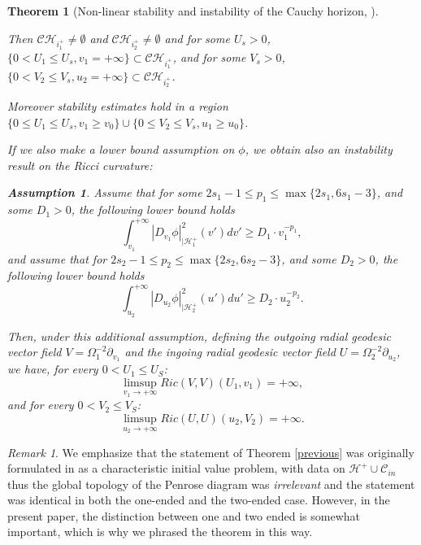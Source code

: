 \documentclass[10pt,a4paper]{article}
\theoremstyle{plain}
\newtheorem{thm}{Theorem}[section]
\theoremstyle{remark}
\newtheorem{rmk}{Remark}[section]
\theoremstyle{definition}
\newtheorem{hyp}{Assumption}
\theoremstyle{plain}
\theoremstyle{remark}
\theoremstyle{definition}
\newcommand{\CHone}{\mathcal{CH}_{i^+_1}}
\newcommand{\CHtwo}{\mathcal{CH}_{i^+_2}}
\numberwithin{equation}{section}
\begin{document}
\begin{thm}[Non-linear stability and instability of the Cauchy horizon, \cite{Moi}]
\begin{enumerate}
		
		
		
		
		
		
		
		
		
		
		
		
		
		Then $\CHone \neq \emptyset $ and $\CHtwo \neq \emptyset $ and for some $U_s>0$, $ \{ 0 < U_1 \leq U_s, v_1=+\infty \} \subset \CHone$, and for some $V_s>0$, $ \{ 0 < V_2 \leq V_s, u_2=+\infty \} \subset \CHtwo$. 
		
		Moreover stability estimates hold in a region $\{ 0 \leq U_1 \leq U_s, v_1\geq v_0\} \cup \{ 0 \leq V_2 \leq V_s, u_1\geq u_0\}$.
		
		
		
		If we also make a lower bound assumption on $\phi$, we obtain also an instability result on the Ricci curvature: \begin{hyp}
			Assume that for some $2s_1-1 \leq p_1 \leq  \max \{2s_1, 6s_1-3\}$, and some $D_1>0$, the following lower bound holds $$ \int_{v_1}^{+\infty}|D_{v_1} \phi|_{|\mathcal{H}^+_1}^2(v')dv' \geq D_1 \cdot v_1^{-p_1},$$ 	and assume that for $2s_2-1 \leq p_2 \leq  \max \{2s_2, 6s_2-3\}$, and some $D_2>0$, the following lower bound holds $$ \int_{u_2}^{+\infty}|D_{u_2} \phi|_{|\mathcal{H}^+_2}^2(u')du' \geq D_2 \cdot u_2^{-p_2}.$$
		\end{hyp}
		
		Then, under this additional assumption, defining the outgoing radial geodesic vector field $V= \Omega_1^{-2} \partial_{v_1}$ and the ingoing radial geodesic vector field $U= \Omega_2^{-2} \partial_{u_2}$, we have, for every $0<U_1 \leq U_S$: $$ \limsup_{v_1 \rightarrow+\infty} Ric(V,V)(U_1,v_1)=+\infty, $$ and for every $0 < V_2 \leq V_S$: $$ \limsup_{u_2 \rightarrow+\infty} Ric(U,U)(u_2,V_2)=+\infty.$$
		
	\end{enumerate}	
	
\end{thm}	\begin{rmk}
We emphasize that the statement of Theorem \ref{previous} was originally formulated in \cite{Moi} as a characteristic initial value problem, with data on $\mathcal{H}^+ \cup \mathcal{C}_{in} $ thus the global topology of the Penrose diagram was \textit{irrelevant} and the statement was identical in both the one-ended and the two-ended case. However, in the present paper, the distinction between one and two ended is somewhat important, which is why we phrased the theorem in this way. 
\end{rmk}
\end{document}
